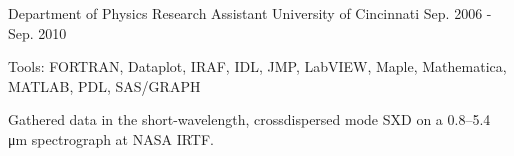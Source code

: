 \begin{cventries}
  \cvexpentry
    {Department of Physics}
    {Research Assistant} %
    {University of Cincinnati}
    {Sep. 2006 - Sep. 2010}
   {
     \begin{cvheavyparagraph}
       Tools: FORTRAN, Dataplot, IRAF, IDL, JMP, LabVIEW, Maple, Mathematica, MATLAB, PDL, SAS/GRAPH
     \end{cvheavyparagraph}
   }
    {
      \begin{cvcompactparagraph}
        Gathered data in the short-wavelength, crossdispersed mode SXD on a 0.8–5.4 μm spectrograph at NASA IRTF.
      \end{cvcompactparagraph}
    }

\end{cventries}
